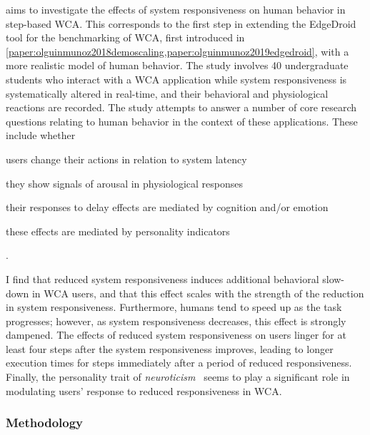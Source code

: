  aims to investigate the effects of system responsiveness on human behavior in step-based \gls{WCA}.
This corresponds to the first step in extending the EdgeDroid tool for the benchmarking of \gls{WCA}, first introduced in \cref{paper:olguinmunoz2018demoscaling,paper:olguinmunoz2019edgedroid}, with a more realistic model of human behavior.
The study involves \num{40} undergraduate students who interact with a \gls{WCA} application while system responsiveness is systematically altered in real-time, and their behavioral and physiological reactions are recorded.
The study attempts to answer a number of core research questions relating to human behavior in the context of these applications.
These include whether
\begin{inlineenum}
    \item users change their actions in relation to system latency
    \item they show signals of arousal in physiological responses
    \item their responses to delay effects are mediated by cognition and/or emotion
    \item these effects are mediated by personality indicators
\end{inlineenum}.

I find that reduced system responsiveness induces additional behavioral slow-down in \gls{WCA} users, and that this effect scales with the strength of the reduction in system responsiveness.
Furthermore, humans tend to speed up as the task progresses;
however, as system responsiveness decreases, this effect is strongly dampened.
The effects of reduced system responsiveness on users linger for at least four steps after the system responsiveness improves, leading to longer execution times for steps immediately after a period of reduced responsiveness.
Finally, the personality trait of \emph{neuroticism}~\cite{john1999big} seems to play a significant role in modulating users' response to reduced responsiveness in \gls{WCA}.

\subsubsection{Methodology}

